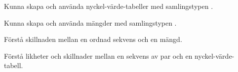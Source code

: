 
\item Kunna skapa och använda nyckel-värde-tabeller med samlingstypen .
\item Kunna skapa och använda mängder med samlingstypen .
\item Förstå skillnaden mellan en ordnad sekvens och en mängd.
\item Förstå likheter och skillnader mellan en sekvens av par och en nyckel-värde-tabell. 
